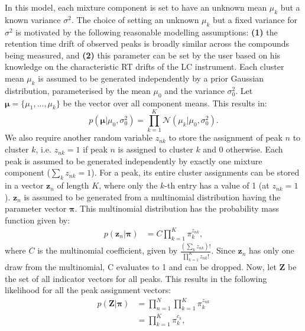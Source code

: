In this model, each mixture component is set to have an unknown mean $\mu_{k}$ but a known variance $\sigma^2$. The choice of setting an unknown $\mu_k$ but a fixed variance for $\sigma^2$ is motivated by the following reasonable modelling assumptions: \textbf{(1)} the retention time drift of observed peaks is broadly similar across the compounds being measured, and \textbf{(2)} this parameter can be set by the user based on his knowledge on the characteristic RT drifts of the LC instrument. Each cluster mean $\mu_k$ is assumed to be generated independently by a prior Gaussian distribution, parameterised by the mean $\mu_0$ and the variance $\sigma^2_0$. Let $\boldsymbol{\mu}=\{\mu_{1},...,\mu_{k}\}$ be the vector over all component means. This results in:
\begin{equation}
p(\boldsymbol{\mu} \vert \mu_0, \sigma^2_0) = \prod_{k=1}^K \mathcal{N}(\mu_k \vert \mu_0, \sigma^2_0).
\label{eq:background-prior-gaussian}
\end{equation}
We also require another random variable $z_{nk}$ to store the assignment of peak $n$ to cluster $k$, i.e. $z_{nk}=1$ if peak $n$ is assigned to cluster $k$ and 0 otherwise. Each peak is assumed to be generated independently by exactly one mixture component ($\sum_{k} z_{nk} = 1$). For a peak, its entire cluster assignments can be stored in a vector $\boldsymbol{z}_{n}$ of length $K$, where only the $k$-th entry has a value of 1 (at $z_{nk}=1$). $\boldsymbol{z}_{n}$ is assumed to be generated from a multinomial distribution having the parameter vector $\boldsymbol{\pi}$. This multinomial distribution has the probability mass function given by:
\begin{equation}
\begin{aligned}
p(\boldsymbol{z}_n \vert \boldsymbol{\pi}) &= C \prod_{k=1}^{K} \pi_k^{z_{nk}},
\end{aligned}
\label{eq:background-zn_pmf}
\end{equation}
where $C$ is the multinomial coefficient, given by $\frac{(\sum_k z_{nk})!}{\prod_{k=1}^K z_{nk}!}$. Since $\boldsymbol{z}_{n}$ has only one draw from the multinomial, C evaluates to 1 and can be dropped. Now, let $\boldsymbol{Z}$ be the set of all indicator vectors for all peaks. This results in the following likelihood for all the peak assignment vectors:
\begin{equation}
\begin{aligned}
p(\boldsymbol{Z} \vert \boldsymbol{\pi}) &= \prod_{n=1}^N \prod_{k=1}^{K} \pi_k^{z_{nk}} \\
                                                              &= \prod_{k=1}^{K} \pi_k^{c_{k}},
\end{aligned}
\label{eq:background-z-given-pi}
\end{equation}

